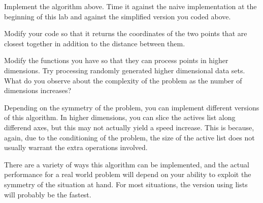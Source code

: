 \begin{problem}
Implement the algorithm above. 
Time it against the naive implementation at the beginning of this lab and against the simplified version you coded above.
\end{problem}

\begin{problem}
Modify your code so that it returns the coordinates of the two points that are closest together in addition to the distance between them.
\end{problem}

\begin{problem}
Modify the functions you have so that they can process points in higher dimensions. 
Try processing randomly generated higher dimensional data sets. 
What do you observe about the complexity of the problem as the number of dimensions increases?
\end{problem}

Depending on the symmetry of the problem, you can implement different versions of this algorithm. 
In higher dimensions, you can slice the actives list along differend axes, but this may not actually yield a speed increase. 
This is because, again, due to the conditioning of the problem, the size of the active list does not usually warrant the extra operations involved. 

There are a variety of ways this algorithm can be implemented, and the actual performance for a real world problem will depend on your ability to exploit the symmetry of the situation at hand. For most situations, the version using lists will probably be the fastest. 
